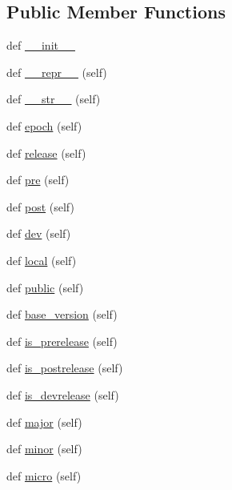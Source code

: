 \subsection*{Public Member Functions}
\begin{DoxyCompactItemize}
\item 
def \hyperlink{classpip_1_1__vendor_1_1packaging_1_1version_1_1Version_a8c64d20601fb0d7090284241a339271c}{\+\_\+\+\_\+init\+\_\+\+\_\+}
\item 
def \hyperlink{classpip_1_1__vendor_1_1packaging_1_1version_1_1Version_a5a1c8d0f81fdf8b731bc089fc046d1bb}{\+\_\+\+\_\+repr\+\_\+\+\_\+} (self)
\item 
def \hyperlink{classpip_1_1__vendor_1_1packaging_1_1version_1_1Version_a89cfad69389bb81c77dccfc5f41912b1}{\+\_\+\+\_\+str\+\_\+\+\_\+} (self)
\item 
def \hyperlink{classpip_1_1__vendor_1_1packaging_1_1version_1_1Version_a7d9942c51d310a4e395788915f253ea2}{epoch} (self)
\item 
def \hyperlink{classpip_1_1__vendor_1_1packaging_1_1version_1_1Version_a9a7eebbcea14e5ba39b53fe22e970e53}{release} (self)
\item 
def \hyperlink{classpip_1_1__vendor_1_1packaging_1_1version_1_1Version_ad36a4b79d66fe28192e930c137228d47}{pre} (self)
\item 
def \hyperlink{classpip_1_1__vendor_1_1packaging_1_1version_1_1Version_a3b231e50f38d33aee1c3bd2ad93e7ad0}{post} (self)
\item 
def \hyperlink{classpip_1_1__vendor_1_1packaging_1_1version_1_1Version_ac0821f0f27bd4437b334d769f28c64cb}{dev} (self)
\item 
def \hyperlink{classpip_1_1__vendor_1_1packaging_1_1version_1_1Version_aa56fefde7bc6c16690c03d29513fbcd0}{local} (self)
\item 
def \hyperlink{classpip_1_1__vendor_1_1packaging_1_1version_1_1Version_a604d586e6fc883bd9bf40bfe5fd8271e}{public} (self)
\item 
def \hyperlink{classpip_1_1__vendor_1_1packaging_1_1version_1_1Version_a36f08f73694b89833ede919f2a68aada}{base\+\_\+version} (self)
\item 
def \hyperlink{classpip_1_1__vendor_1_1packaging_1_1version_1_1Version_a69d62ffb6dd6870444014571d52772a3}{is\+\_\+prerelease} (self)
\item 
def \hyperlink{classpip_1_1__vendor_1_1packaging_1_1version_1_1Version_ad1a9484ae24ec81597e59092ad48bc63}{is\+\_\+postrelease} (self)
\item 
def \hyperlink{classpip_1_1__vendor_1_1packaging_1_1version_1_1Version_af3e258f4185a5ec2ca4c7b7511348147}{is\+\_\+devrelease} (self)
\item 
def \hyperlink{classpip_1_1__vendor_1_1packaging_1_1version_1_1Version_aa7bfb97d68bf882795241c59d7791128}{major} (self)
\item 
def \hyperlink{classpip_1_1__vendor_1_1packaging_1_1version_1_1Version_acb8992f2856ccdca34675889eeca2f4a}{minor} (self)
\item 
def \hyperlink{classpip_1_1__vendor_1_1packaging_1_1version_1_1Version_aedbe863d5879336b7530edb72f22129b}{micro} (self)
\end{DoxyCompactItemize}


